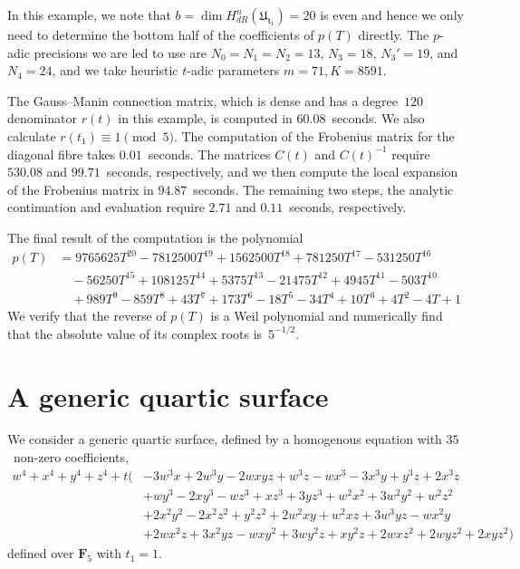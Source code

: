 In this example, we note that $b = \dim H_{dR}^n(\mathfrak{U_{t_1}}) = 20$ is 
even and hence we only need to determine the bottom half of the 
coefficients of $p(T)$ directly.  The $p$-adic precisions we are led to 
use are $N_0 = N_1 = N_2 = 13$, $N_3 = 18$, $N_3' = 19$, and $N_4 = 24$, 
and we take heuristic $t$-adic parameters $m = 71, K = 8591$.

The Gauss--Manin connection matrix, which is dense and has a degree~$120$ 
denominator $r(t)$ in this example, is computed in $60.08$~seconds.  We 
also calculate $r(t_1) \equiv 1 \pmod{5}$.  The computation of the 
Frobenius matrix for the diagonal fibre takes $0.01$~seconds.  The 
matrices $C(t)$ and $C(t)^{-1}$ require $530.08$ and $99.71$~seconds, 
respectively, and we then compute the local expansion of the Frobenius 
matrix in $94.87$~seconds.  The remaining two steps, the analytic continuation 
and evaluation require $2.71$ and $0.11$~seconds, respectively.

The final result of the computation is the polynomial 
\begin{equation*}
\begin{split}
p(T) & = 9765625 T^{20}-7812500 T^{19}+1562500 T^{18}+781250 T^{17}-531250 T^{16}\\
     & \quad -56250 T^{15}+108125 T^{14}+5375 T^{13}-21475 T^{12}+4945 T^{11}-503 T^{10}\\
     & \quad +989 T^9-859 T^8+43 T^7+173 T^6-18 T^5-34 T^4+10 T^3+4 T^2-4 T+1
\end{split}
\end{equation*}
We verify that the reverse of $p(T)$ is a Weil polynomial and numerically 
find that the absolute value of its complex roots is~$5^{-1/2}$.

\section{A generic quartic surface}

We consider a generic quartic surface, defined by a homogenous equation 
with $35$~non-zero coefficients,
\begin{equation*}
\begin{split}
w^4 + x^4 + y^4 + z^4 
+ t \bigl( & -3 w^3 x + 2 w^3 y - 2 w x y z + w^3 z - w x^3 - 3 x^3 y + y^3 z 
          + 2 x^3 z \\ & + w y^3 - 2 x y^3 - w z^3 + x z^3 + 3 y z^3 + w^2 x^2 
          + 3 w^2 y^2 + w^2 z^2 \\ & + 2 x^2 y^2 - 2 x^2 z^2 + y^2 z^2 
          + 2 w^2 x y + w^2 x z + 3 w^3 y z - w x^2 y \\ & + 2 w x^2 z 
          + 3 x^2 y z - w x y^2 
          + 3 w y^2 z + x y^2 z + 2 w x z^2 + 2 w y z^2 + 2 x y z^2 \bigr)
\end{split}
\end{equation*}
defined over $\mathbf{F}_5$ with $t_1 = 1$.

